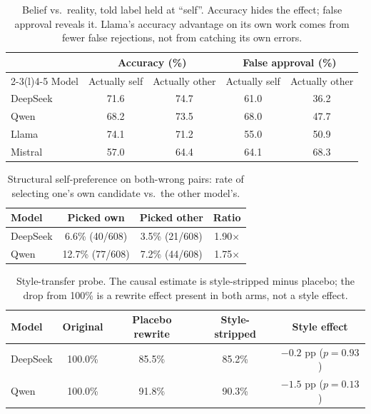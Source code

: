 \documentclass{article}
\begin{document}
\begingroup
\setlength{\intextsep}{5pt plus 1pt minus 1pt}
\setlength{\abovecaptionskip}{4pt}
\setlength{\belowcaptionskip}{2pt}
\renewcommand{\arraystretch}{0.95}
\vspace{5pt}
\begin{table}[H]
\centering\small
\caption{Belief vs.\ reality, told label held at ``self''. Accuracy hides the effect;
false approval reveals it. Llama's accuracy advantage on its own work comes from fewer
false rejections, not from catching its own errors.}
\label{tab:belief-reality}
\begin{tabular}{lcccc}
\toprule
& \multicolumn{2}{c}{Accuracy (\%)} & \multicolumn{2}{c}{False approval (\%)} \\
\cmidrule(r){2-3}\cmidrule(l){4-5}
Model & Actually self & Actually other & Actually self & Actually other \\
\midrule
DeepSeek & 71.6 & 74.7 & 61.0 & 36.2 \\
Qwen     & 68.2 & 73.5 & 68.0 & 47.7 \\
Llama    & 74.1 & 71.2 & 55.0 & 50.9 \\
Mistral  & 57.0 & 64.4 & 64.1 & 68.3 \\
\bottomrule
\end{tabular}
\end{table}

\begin{table}[H]
\centering\small
\caption{Structural self-preference on both-wrong pairs: rate of selecting one's own
candidate vs.\ the other model's.}
\label{tab:self-preference}
\begin{tabular}{lccc}
\toprule
Model & Picked own & Picked other & Ratio \\
\midrule
DeepSeek & 6.6\% (40/608)  & 3.5\% (21/608) & 1.90$\times$ \\
Qwen     & 12.7\% (77/608) & 7.2\% (44/608) & 1.75$\times$ \\
\bottomrule
\end{tabular}
\end{table}

\begin{table}[H]
\centering\small
\caption{Style-transfer probe. The causal estimate is style-stripped minus placebo; the
drop from 100\% is a rewrite effect present in both arms, not a style effect.}
\label{tab:style-transfer}
\begin{tabular}{lcccc}
\toprule
Model & Original & Placebo rewrite & Style-stripped & Style effect \\
\midrule
DeepSeek & 100.0\% & 85.5\% & 85.2\% & $-0.2$ pp ($p=0.93$) \\
Qwen     & 100.0\% & 91.8\% & 90.3\% & $-1.5$ pp ($p=0.13$) \\
\bottomrule
\end{tabular}
\end{table}
\endgroup
\end{document}
